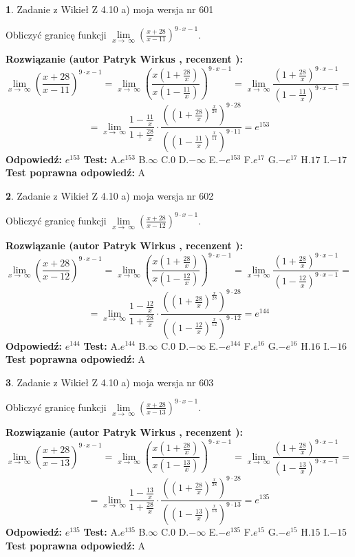 \documentclass[12pt, a4paper]{article}
\theoremstyle{definition} %
\newtheorem{zad}{}
\newcommand{\zadStart}[1]{\begin{zad}#1\newline}
\newcommand{\zadStop}{\end{zad}}
\newcommand{\rozwStart}[2]{\noindent \textbf{Rozwiązanie (autor #1 , recenzent #2): }\newline}
\newcommand{\rozwStop}{\newline}
\newcommand{\odpStart}{\noindent \textbf{Odpowiedź:}\newline}
\newcommand{\odpStop}{\newline}
\newcommand{\testStart}{\noindent \textbf{Test:}\newline}
\newcommand{\testStop}{\newline}
\newcommand{\kluczStart}{\noindent \textbf{Test poprawna odpowiedź:}\newline}
\newcommand{\kluczStop}{\newline}
\begin{document}
\zadStart{Zadanie z Wikieł Z 4.10 a) moja wersja nr 601}

Obliczyć granicę funkcji  $\lim\limits_{x\to\ \infty}(\frac{x+28}{x-11})^{9\cdot x-1}$.
\zadStop
\rozwStart{Patryk Wirkus}{}
$$\lim\limits_{x\to\ \infty}(\frac{x+28}{x-11})^{9\cdot x-1} = \lim\limits_{x\to\ \infty}(\frac{x(1+\frac{28}{x})}{x(1-\frac{11}{x})})^{9\cdot x-1}=\lim\limits_{x\to\ \infty}\frac{(1+\frac{28}{x})^{9\cdot x-1}}{(1-\frac{11}{x})^{9\cdot x-1}}=$$
$$=\lim\limits_{x\to\ \infty}\frac{1-\frac{11}{x}}{1+\frac{28}{x}}\cdot\frac{((1+\frac{28}{x})^{\frac{x}{28}})^{9\cdot28}}{((1-\frac{11}{x})^{\frac{x}{11}})^{9\cdot11}}=e^{153}$$
\rozwStop
\odpStart
$e^{153}$
\odpStop
\testStart
A.$e^{153}$ B.$\infty$ C.$0$ D.$-\infty$ E.$-e^{153}$
F.$e^{17}$ G.$-e^{17}$
H.$17$
I.$-17$
\testStop
\kluczStart
A
\kluczStop



\zadStart{Zadanie z Wikieł Z 4.10 a) moja wersja nr 602}

Obliczyć granicę funkcji  $\lim\limits_{x\to\ \infty}(\frac{x+28}{x-12})^{9\cdot x-1}$.
\zadStop
\rozwStart{Patryk Wirkus}{}
$$\lim\limits_{x\to\ \infty}(\frac{x+28}{x-12})^{9\cdot x-1} = \lim\limits_{x\to\ \infty}(\frac{x(1+\frac{28}{x})}{x(1-\frac{12}{x})})^{9\cdot x-1}=\lim\limits_{x\to\ \infty}\frac{(1+\frac{28}{x})^{9\cdot x-1}}{(1-\frac{12}{x})^{9\cdot x-1}}=$$
$$=\lim\limits_{x\to\ \infty}\frac{1-\frac{12}{x}}{1+\frac{28}{x}}\cdot\frac{((1+\frac{28}{x})^{\frac{x}{28}})^{9\cdot28}}{((1-\frac{12}{x})^{\frac{x}{12}})^{9\cdot12}}=e^{144}$$
\rozwStop
\odpStart
$e^{144}$
\odpStop
\testStart
A.$e^{144}$ B.$\infty$ C.$0$ D.$-\infty$ E.$-e^{144}$
F.$e^{16}$ G.$-e^{16}$
H.$16$
I.$-16$
\testStop
\kluczStart
A
\kluczStop



\zadStart{Zadanie z Wikieł Z 4.10 a) moja wersja nr 603}

Obliczyć granicę funkcji  $\lim\limits_{x\to\ \infty}(\frac{x+28}{x-13})^{9\cdot x-1}$.
\zadStop
\rozwStart{Patryk Wirkus}{}
$$\lim\limits_{x\to\ \infty}(\frac{x+28}{x-13})^{9\cdot x-1} = \lim\limits_{x\to\ \infty}(\frac{x(1+\frac{28}{x})}{x(1-\frac{13}{x})})^{9\cdot x-1}=\lim\limits_{x\to\ \infty}\frac{(1+\frac{28}{x})^{9\cdot x-1}}{(1-\frac{13}{x})^{9\cdot x-1}}=$$
$$=\lim\limits_{x\to\ \infty}\frac{1-\frac{13}{x}}{1+\frac{28}{x}}\cdot\frac{((1+\frac{28}{x})^{\frac{x}{28}})^{9\cdot28}}{((1-\frac{13}{x})^{\frac{x}{13}})^{9\cdot13}}=e^{135}$$
\rozwStop
\odpStart
$e^{135}$
\odpStop
\testStart
A.$e^{135}$ B.$\infty$ C.$0$ D.$-\infty$ E.$-e^{135}$
F.$e^{15}$ G.$-e^{15}$
H.$15$
I.$-15$
\testStop
\kluczStart
A
\kluczStop
\end{document}
